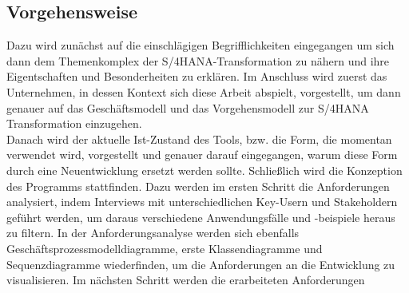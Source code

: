 \subsection{Vorgehensweise}
Dazu wird zunächst auf die einschlägigen Begrifflichkeiten eingegangen um sich dann dem Themenkomplex der S/4HANA-Transformation zu nähern und ihre Eigentschaften und Besonderheiten zu erklären. Im Anschluss wird zuerst das Unternehmen, in dessen Kontext sich diese Arbeit abspielt, vorgestellt, um dann genauer auf das Geschäftsmodell und das Vorgehensmodell zur S/4HANA Transformation einzugehen. \\
Danach wird der aktuelle Ist-Zustand des Tools, bzw. die Form, die momentan verwendet wird, vorgestellt und genauer darauf eingegangen, warum diese Form durch eine Neuentwicklung ersetzt werden sollte. Schließlich wird die Konzeption des Programms stattfinden. Dazu werden im ersten Schritt die Anforderungen analysiert, indem Interviews mit unterschiedlichen Key-Usern und Stakeholdern geführt werden, um daraus verschiedene Anwendungsfälle und -beispiele heraus zu filtern. In der Anforderungsanalyse werden sich ebenfalls Geschäftsprozessmodelldiagramme, erste Klassendiagramme und Sequenzdiagramme wiederfinden, um die Anforderungen an die Entwicklung zu visualisieren. Im nächsten Schritt werden die erarbeiteten Anforderungen 
